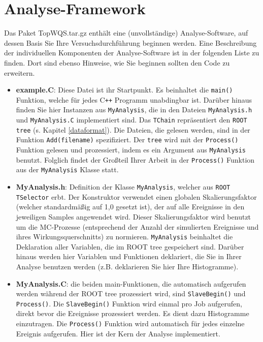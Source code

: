 \section{Analyse-Framework}
\label{framework}
Das Paket TopWQS.tar.gz enth\"alt eine (unvollst\"andige) Analyse-Software, auf dessen Basis Sie Ihre Versuchsdurchf\"uhrung beginnen werden. Eine Beschreibung der individuellen Komponenten der Analyse-Software ist in der folgenden Liste zu finden. Dort sind ebenso Hinweise, wie Sie beginnen sollten den Code zu erweitern.
\begin{itemize}
	\item \textbf{example.C}: Diese Datei ist ihr Startpunkt. Es beinhaltet die \texttt{main()} Funktion, welche f\"ur jedes C\texttt{++} Programm unabdingbar ist. Dar\"uber hinaus finden Sie hier Instanzen aus \texttt{MyAnalysis}, die in den Dateien \texttt{MyAnalysis.h} und \texttt{MyAnalysis.C} implementiert sind. Das \texttt{TChain} repr\"asentiert den \texttt{ROOT tree} (s. Kapitel \ref{dataformat}). Die Dateien, die gelesen werden, sind in der Funktion \texttt{Add(filename)} spezifiziert. Der \texttt{tree} wird mit der \texttt{Process()} Funktion gelesen und prozessiert, indem es ein Argument aus \texttt{MyAnalysis} benutzt. Folglich findet der Gro\ss{}teil Ihrer Arbeit in der \texttt{Process()} Funktion aus der \texttt{MyAnalysis} Klasse statt.
	\item \textbf{MyAnalysis.h}: Definition der Klasse \texttt{MyAnalysis}, welcher aus \texttt{ROOT TSelector} erbt. Der Konstruktor verwendet einen globalen Skalierungsfaktor (welcher standardm\"a\ss{}ig auf 1,0 gesetzt ist), der auf alle Ereignisse in den jeweiligen Samples angewendet wird. Dieser Skalierungsfaktor wird benutzt um die MC-Prozesse (ent\-sprech\-end der Anzahl der simulierten Ereignisse und ihres Wirkungsquerschnitts) zu normieren. \texttt{MyAnalysis} beinhaltet die Deklaration aller Variablen, die im ROOT tree gespeichert sind. Dar\"uber hinaus werden hier Variablen und Funktionen deklariert, die Sie in Ihrer Analyse benutzen werden (z.B. deklarieren Sie hier Ihre Histogramme). 
	\item \textbf{MyAnalysis.C}: die beiden main-Funktionen, die automatisch aufgerufen werden w\"ahrend der ROOT tree prozessiert wird, sind \texttt{SlaveBegin()} und \texttt{Process()}. Die \texttt{SlaveBegin()} Funktion wird einmal pro Job aufgerufen, direkt bevor die Ereignisse prozessiert werden. Es dient dazu Histogramme einzutragen. Die \texttt{Process()} Funktion wird automatisch f\"ur jedes einzelne Ereignis aufgerufen. Hier ist der Kern der Analyse implementiert. 

\end{itemize}
